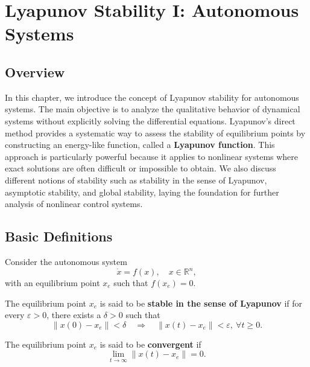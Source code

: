\chapterspaceabove{6.75cm} %
\chapterspacebelow{7.25cm} %

\chapter{Lyapunov Stability I: Autonomous Systems}

\section{Overview}
In this chapter, we introduce the concept of Lyapunov stability for autonomous systems. The main objective is to analyze the qualitative behavior of dynamical systems without explicitly solving the differential equations. Lyapunov’s direct method provides a systematic way to assess the stability of equilibrium points by constructing an energy-like function, called a \textbf{Lyapunov function}. 
This approach is particularly powerful because it applies to nonlinear systems where exact solutions are often difficult or impossible to obtain. We also discuss different notions of stability such as stability in the sense of Lyapunov, asymptotic stability, and global stability, laying the foundation for further analysis of nonlinear control systems.

\section{Basic Definitions}

Consider the autonomous system
\begin{equation}
    \dot{x} = f(x), \quad x \in \mathbb{R}^n,
\end{equation}
with an equilibrium point $x_e$ such that $f(x_e) = 0$.

\begin{definition}[Stability]
The equilibrium point $x_e$ is said to be \textbf{stable in the sense of Lyapunov} if for every $\varepsilon > 0$, there exists a $\delta > 0$ such that
\[
    \|x(0) - x_e\| < \delta \quad \Rightarrow \quad \|x(t) - x_e\| < \varepsilon, \ \forall t \geq 0.
\]
\end{definition}

\begin{definition}[Convergence]
The equilibrium point $x_e$ is said to be \textbf{convergent} if
\[
    \lim_{t \to \infty} \|x(t) - x_e\| = 0.
\]
\end{definition}

